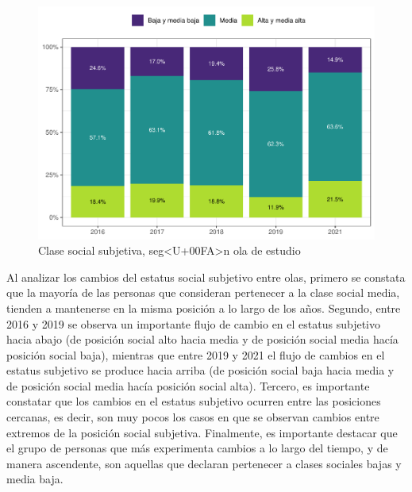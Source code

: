 \documentclass[
  12pt,
]{book}
\begin{document}
\begin{figure}

{\centering \includegraphics{reporte-elsoc_files/figure-latex/ess-ola-1} 

}

\caption{Clase social subjetiva, seg<U+00FA>n ola de estudio}\label{fig:ess-ola}
\end{figure}

Al analizar los cambios del estatus social subjetivo entre olas, primero se constata que la mayoría de las personas que consideran pertenecer a la clase social media, tienden a mantenerse en la misma posición a lo largo de los años. Segundo, entre 2016 y 2019 se observa un importante flujo de cambio en el estatus subjetivo hacia abajo (de posición social alto hacia media y de posición social media hacía posición social baja), mientras que entre 2019 y 2021 el flujo de cambios en el estatus subjetivo se produce hacia arriba (de posición social baja hacia media y de posición social media hacía posición social alta). Tercero, es importante constatar que los cambios en el estatus subjetivo ocurren entre las posiciones cercanas, es decir, son muy pocos los casos en que se observan cambios entre extremos de la posición social subjetiva. Finalmente, es importante destacar que el grupo de personas que más experimenta cambios a lo largo del tiempo, y de manera ascendente, son aquellas que declaran pertenecer a clases sociales bajas y media baja.
\end{document}
